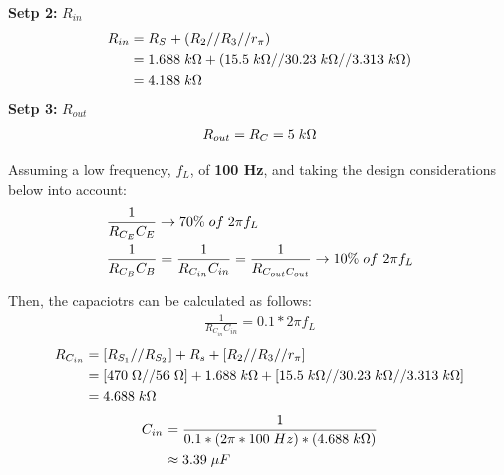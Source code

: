 \documentclass{article}
\begin{document}
	\textbf{Setp 2:} $R_{in}$
	\begin{align*}
		R_{in} &= R_S + (R_2 // R_3 // r_{\pi})\\
		&= 1.688 \hspace{1mm} k\Omega + (15.5 \hspace{1mm} k\Omega // 30.23 \hspace{1mm} k\Omega // 3.313 \hspace{1mm} k\Omega)\\
		&= 4.188 \hspace{1mm} k\Omega
	\end{align*}
	\textbf{Setp 3:} $R_{out}$
	\begin{align*}
		R_{out} = R_C = 5 \hspace{1mm} k\Omega
	\end{align*}
	
	\noindent Assuming a low frequency, $f_L$, of \textbf{100 Hz}, and taking the design considerations below into account:
	\begin{align*}
		&\frac{1}{R_{C_E} C_E} \rightarrow 70\% \hspace{1mm} of \hspace{1mm} 2\pi f_L\\
		&\frac{1}{R_{C_B} C_B} = \frac{1}{R_{C_{in}} C_{in}} = \frac{1}{R_{C_{out} C_{out}}} \rightarrow 10\% \hspace{1mm} of \hspace{1mm} 2\pi f_L
	\end{align*}
	
	\pagebreak
	\noindent Then, the capaciotrs can be calculated as follows:\\
	\begin{align*}
		\frac{1}{R_{C_{in}} C_{in}} = 0.1 * 2\pi f_L
	\end{align*}
	\begin{align*}
		R_{C_{in}} &= [R_{S_1} // R_{S_2}] + R_s + [R_2 // R_3 // r_{\pi}]\\
		&= [470 \hspace{1mm} \Omega // 56 \hspace{1mm} \Omega] + 1.688 \hspace{1mm} k\Omega + [15.5 \hspace{1mm} k\Omega // 30.23 \hspace{1mm} k\Omega // 3.313 \hspace{1mm} k\Omega]\\
		&= 4.688 \hspace{1mm} k\Omega
	\end{align*}
	\begin{align*}
		C_{in} &= \frac{1}{0.1 * (2\pi * 100 \hspace{1mm} Hz) * (4.688 \hspace{1mm} k\Omega)}\\
		&\approx 3.39 \hspace{1mm} \mu F\\ 
	\end{align*}
	
\end{document}
